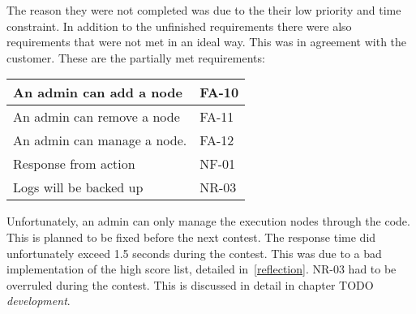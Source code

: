 The reason they were not completed was due to the their low priority and
time constraint. In addition to the unfinished requirements there were also 
requirements that were not met in an ideal way.
This was in agreement with the customer. These are the partially met
requirements:

\begin{supertabular}{|l|l|}
    \hline
    An admin can add a node & FA-10 \\
    \hline
    An admin can remove a node & FA-11 \\
    \hline
    An admin can manage a node.  & FA-12 \\
    \hline
    Response from action & NF-01 \\
    \hline
    Logs will be backed up & NR-03 \\
    \hline
\end{supertabular}

Unfortunately, an admin can only manage the execution nodes through the
code. This is planned to be fixed before the next contest. The response
time did unfortunately exceed 1.5 seconds during the contest. This was
due to a bad implementation of the high score list, detailed
in~\ref{reflection}. NR-03 had to be overruled during the contest. This is
discussed in detail in chapter TODO
\textit{development}.
